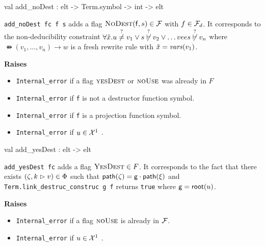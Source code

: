 \begin{ocamldocsigend}
\begin{ocamldocdescription}
\end{ocamldocdescription}


\label{val:Constraint.Frame.add-underscorenoDest}\begin{ocamldoccode}
val add_noDest : elt -> Term.symbol -> int -> elt
\end{ocamldoccode}
\begin{ocamldocdescription}
{\tt{add\_noDest fc f s}} adds a flag $\textsc{NoDest}(\mathsf{f},s) \in \mathcal{F}$ with $f \in \mathcal{F}_d$.
      It corresponds to the non-deducibility constraint $\forall \tilde{x}. u \stackrel{?}{\neq} v_1 \vee s \not\stackrel{?}{\vdash} v_2 \vee \ldots vee s \not\stackrel{?}{\vdash} v_n$
      where $\ffun(v_1, \ldots, v_n) \rightarrow w$ is a fresh rewrite rule with $\tilde{x} = \mathit{vars}(v_1)$. 

{\bf Raises} \begin{itemize}
\item {\tt{Internal\_error}} if a flag $\textsc{yesDest}$ or $\textsc{noUse}$ was already in $F$ 
\item {\tt{Internal\_error}} if {\tt{f}} is not a destructor function symbol. \lowdebug 
\item {\tt{Internal\_error}} if {\tt{f}} is a projection function symbol. \highdebug 
\item {\tt{Internal\_error}} if $u \in \mathcal{X}^1$ \lowdebug .
\end{itemize}



\end{ocamldocdescription}


\label{val:Constraint.Frame.add-underscoreyesDest}\begin{ocamldoccode}
val add_yesDest : elt -> elt
\end{ocamldoccode}
\begin{ocamldocdescription}
{\tt{add\_yesDest fc}} adds a flag $\textsc{YesDest} \in F$.
      It corresponds to the fact that there exists $(\zeta, k \vartriangleright v) \in \Phi$ such that
      $\mathsf{path}(\zeta) = \mathsf{g} \cdot \mathsf{path}(\xi)$  and {\tt{Term.link\_destruc\_construc g f}} returns {\tt{true}}
      where $\mathsf{g} = \mathsf{root}(u)$. 

{\bf Raises} \begin{itemize}
\item {\tt{Internal\_error}} if a flag $\textsc{noUse}$ is already in $\mathcal{F}$. 
\item {\tt{Internal\_error}} if $u \in \mathcal{X}^1$ \lowdebug .
\end{itemize}




\end{ocamldocdescription}
\end{ocamldocsigend}
